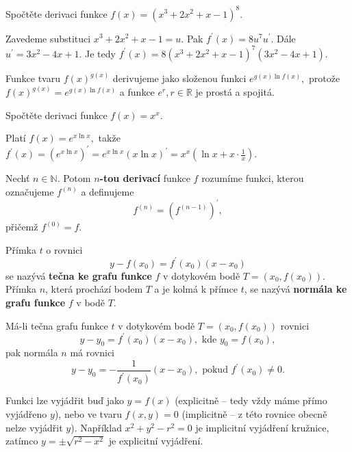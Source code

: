 \begin{priklad}
  Spočtěte derivaci funkce $f(x)=\left (x^3+2x^2+x-1\right )^8.$
\end{priklad}

\begin{reseni}
  Zavedeme substituci $x^3+2x^2+x-1=u$. Pak $f^\prime(x)=8u^7u^\prime$. Dále $u^\prime=3x^2-4x+1.$
  Je tedy $f^\prime(x)=8\left(x^3+2x^2+x-1\right)^7(3x^2-4x+1).$
\end{reseni}

\begin{pozn}
    Funkce tvaru $f(x)^{g(x)}$ derivujeme jako složenou funkci $e^{g(x)\ln f(x)},$
    protože $f(x)^{g(x)}=e^{g(x)\ln f(x)}$ a funkce $e^r, r \in \mathbb R$ je prostá
    a spojitá.
\end{pozn}

\begin{priklad}
  Spočtěte derivaci funkce $f(x)=x^x.$
\end{priklad}

\begin{reseni}
  Platí $f(x)=e^{x\ln x},$ takže $f^\prime(x)=\left (e^{x\ln x}\right)^\prime=e^{x\ln x}(x\ln x)^\prime=
  x^x\left(\ln x+ x\cdot \frac{1}{x}\right).$
\end{reseni}

\begin{definition}
Nechť $n \in \mathbb N$. Potom \textbf{$n$-tou derivací} funkce $f$ rozumíme funkci,
kterou označujeme $f^{(n)}$ a definujeme
$$f^{(n)}=\left ( f^{(n-1)} \right )^\prime, $$
přičemž $f^{(0)}=f.$
\end{definition}

\begin{definition}
Přímka $t$ o rovnici
$$y-f(x_0)=f^\prime(x_0)(x-x_0)$$
se nazývá \textbf{tečna ke grafu funkce} $f$ v dotykovém bodě $T=(x_0,f(x_0))$.
Přímka $n$, která prochází bodem $T$ a je kolmá k přímce $t$, se nazývá \textbf{normála
ke grafu funkce} $f$ v bodě $T.$
\end{definition}

\begin{veta}
    Má-li tečna grafu funkce $t$ v dotykovém bodě $T=(x_0, f(x_0))$ rovnici
    $$y-y_0=f^\prime(x_0)(x-x_0), \textrm{ kde } y_0=f(x_0),$$
    pak normála $n$ má rovnici
    $$y-y_0=-\frac{1}{f^\prime(x_0)}(x-x_0), \textrm{ pokud } f^\prime(x_0)\ne 0.$$
\end{veta}

\begin{pozn}
    Funkci lze vyjádřit buď jako $y=f(x)$ (explicitně -- tedy vždy máme přímo vyjádřeno
    $y$), nebo ve tvaru $f(x,y)=0$ (implicitně -- z této rovnice obecně nelze vyjádřit
    $y$). Například $x^2+y^2-r^2=0$ je implicitní vyjádření kružnice,
    zatímco $y=\pm \sqrt{r^2-x^2} $ je explicitní vyjádření.
\end{pozn}

